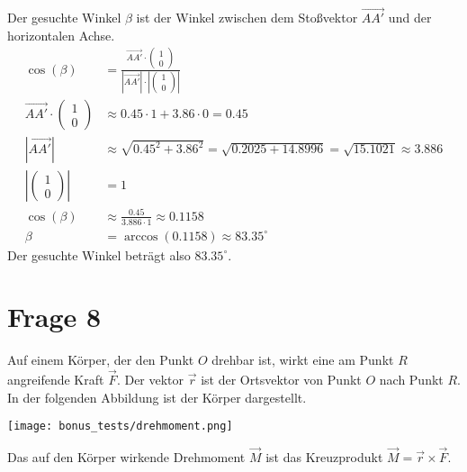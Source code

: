 Der gesuchte Winkel \(\beta\) ist der Winkel zwischen dem Stoßvektor
\(\vec{AA'}\) und der horizontalen Achse.
\begin{align*}
    \cos(\beta)                                          & = \frac{\vec{AA'} \cdot \begin{pmatrix} 1 \\ 0 \end{pmatrix}}{|\vec{AA'}| \cdot |\begin{pmatrix} 1 \\ 0 \end{pmatrix}|} \\
    \vec{AA'} \cdot \begin{pmatrix} 1 \\ 0 \end{pmatrix} & \approx 0.45 \cdot 1 + 3.86 \cdot 0 = 0.45                                                                              \\
    |\vec{AA'}|                                          & \approx \sqrt{0.45^2 + 3.86^2} = \sqrt{0.2025 + 14.8996} = \sqrt{15.1021} \approx 3.886                                 \\
    |\begin{pmatrix} 1 \\ 0 \end{pmatrix}|               & = 1                                                                                                                     \\
    \cos(\beta)                                          & \approx \frac{0.45}{3.886 \cdot 1} \approx 0.1158                                                                       \\
    \beta                                                & = \arccos(0.1158) \approx 83.35^\circ
\end{align*}
Der gesuchte Winkel beträgt also \(83.35^\circ\).

\section{Frage 8}

Auf einem Körper, der den Punkt $O$ drehbar ist, wirkt eine am Punkt $R$
angreifende Kraft $\vec{F}$. Der vektor $\vec{r}$ ist der Ortsvektor von Punkt
$O$ nach Punkt $R$. In der folgenden Abbildung ist der Körper dargestellt.

\texttt{[image: bonus\_tests/drehmoment.png]}

Das auf den Körper wirkende Drehmoment $\vec{M}$ ist das Kreuzprodukt $\vec{M}
    = \vec{r} \times \vec{F}$.

